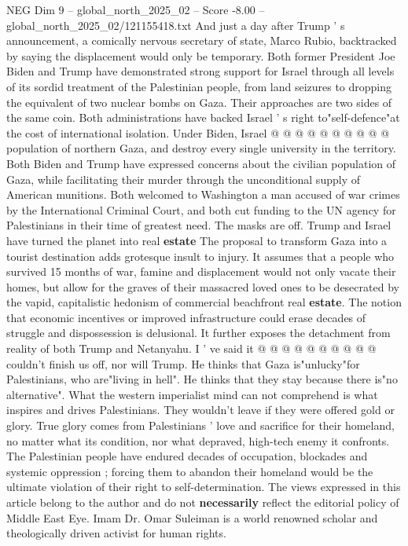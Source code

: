\begin{textsample}{NEG Dim 9 – global\_north\_2025\_02 – Score -8.00 – global\_north\_2025\_02/121155418.txt}
And just a day after Trump ' s announcement, a comically nervous secretary of state, Marco Rubio, backtracked by saying the displacement would only be temporary.
Both former President Joe Biden and Trump have demonstrated strong support for Israel through all levels of its sordid treatment of the Palestinian people, from land seizures to dropping the equivalent of two nuclear bombs on Gaza.
Their approaches are two sides of the same coin.
Both administrations have backed Israel ' s right to"self-defence"at the cost of international isolation.
Under Biden, Israel @ @ @ @ @ @ @ @ @ @ population of northern Gaza, and destroy every single university in the territory.
Both Biden and Trump have expressed concerns about the civilian population of Gaza, while facilitating their murder through the unconditional supply of American munitions.
Both welcomed to Washington a man accused of war crimes by the International Criminal Court, and both cut funding to the UN agency for Palestinians in their time of greatest need.
The masks are off.
Trump and Israel have turned the planet into real \textbf{estate} The proposal to transform Gaza into a tourist destination adds grotesque insult to injury.
It assumes that a people who survived 15 months of war, famine and displacement would not only vacate their homes, but allow for the graves of their massacred loved ones to be desecrated by the vapid, capitalistic hedonism of commercial beachfront real \textbf{estate}.
The notion that economic incentives or improved infrastructure could erase decades of struggle and dispossession is delusional.
It further exposes the detachment from reality of both Trump and Netanyahu.
I ' ve said it @ @ @ @ @ @ @ @ @ @ couldn't finish us off, nor will Trump.
He thinks that Gaza is"unlucky"for Palestinians, who are"living in hell".
He thinks that they stay because there is"no alternative".
What the western imperialist mind can not comprehend is what inspires and drives Palestinians.
They wouldn't leave if they were offered gold or glory.
True glory comes from Palestinians ' love and sacrifice for their homeland, no matter what its condition, nor what depraved, high-tech enemy it confronts.
The Palestinian people have endured decades of occupation, blockades and systemic oppression ; forcing them to abandon their homeland would be the ultimate violation of their right to self-determination.
The views expressed in this article belong to the author and do not \textbf{necessarily} reflect the editorial policy of Middle East Eye.
Imam Dr.
Omar Suleiman is a world renowned scholar and theologically driven activist for human rights.

\end{textsample}
